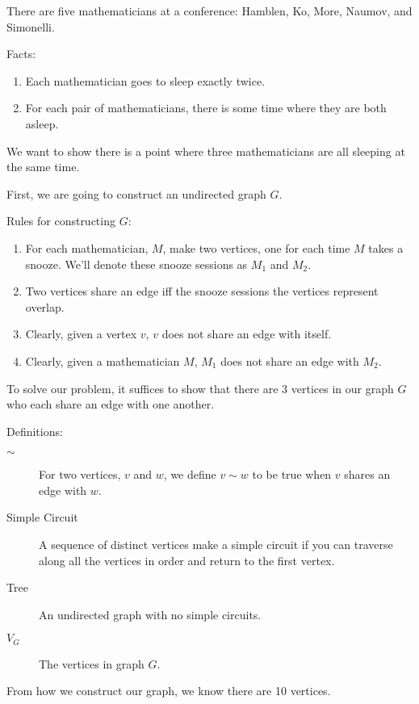 \documentclass[fleqn]{article}
\begin{document}
There are five mathematicians at a conference: Hamblen, Ko, More, Naumov, and Simonelli.

Facts:
\begin{enumerate}
  \item  Each mathematician goes to sleep exactly twice.

  \item  For each pair of mathematicians, there is some time where
         they are both asleep.
\end{enumerate}

We want to show there is a point where three mathematicians are all sleeping at the same time.

First, we are going to construct an undirected graph $G$.

Rules for constructing $G$:
\begin{enumerate}
  \item For each mathematician, $M$, make two vertices, one for each
        time $M$ takes a snooze. We'll denote these snooze sessions
        as $M_1$ and $M_2$.
  \item Two vertices share an edge iff the snooze sessions the vertices
        represent overlap.
  \item Clearly, given a vertex $v$, $v$ does not share an edge with
        itself.
  \item Clearly, given a mathematician $M$, $M_1$ does not share an
        edge with $M_2$.
\end{enumerate}

To solve our problem, it suffices to show that there are 3 vertices in our graph $G$ who each share an edge with one another.

Definitions:
\begin{description}
  \item[$\sim$] For two vertices, $v$ and $w$, we define $v \sim w$
                to be true when $v$ shares an edge with $w$.
  \item[Simple Circuit] A sequence of distinct vertices make a 
                        simple circuit if you can traverse along
                        all the vertices in order and 
                        return to the first vertex.
  \item[Tree] An undirected graph with no simple circuits.
  \item[$V_G$] The vertices in graph $G$.
\end{description}

From how we construct our graph, we know there are 10 vertices.
\end{document}
